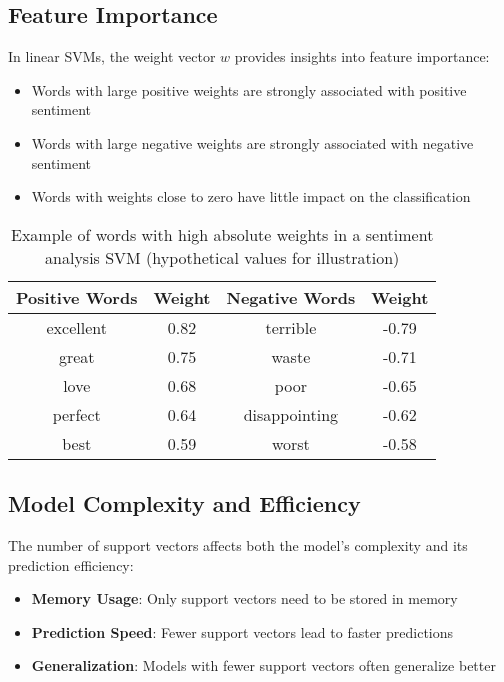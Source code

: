 \documentclass{article}
\begin{document}
\subsection{Feature Importance}
In linear SVMs, the weight vector $w$ provides insights into feature importance:

\begin{itemize}
    \item Words with large positive weights are strongly associated with positive sentiment
    \item Words with large negative weights are strongly associated with negative sentiment
    \item Words with weights close to zero have little impact on the classification
\end{itemize}

\begin{table}[h]
\centering
\begin{tabular}{|c|c||c|c|}
\hline
\textbf{Positive Words} & \textbf{Weight} & \textbf{Negative Words} & \textbf{Weight} \\
\hline
excellent & 0.82 & terrible & -0.79 \\
great & 0.75 & waste & -0.71 \\
love & 0.68 & poor & -0.65 \\
perfect & 0.64 & disappointing & -0.62 \\
best & 0.59 & worst & -0.58 \\
\hline
\end{tabular}
\caption{Example of words with high absolute weights in a sentiment analysis SVM (hypothetical values for illustration)}
\end{table}

\subsection{Model Complexity and Efficiency}
The number of support vectors affects both the model's complexity and its prediction efficiency:

\begin{itemize}
    \item \textbf{Memory Usage}: Only support vectors need to be stored in memory
    \item \textbf{Prediction Speed}: Fewer support vectors lead to faster predictions
    \item \textbf{Generalization}: Models with fewer support vectors often generalize better
\end{itemize}
\end{document}
